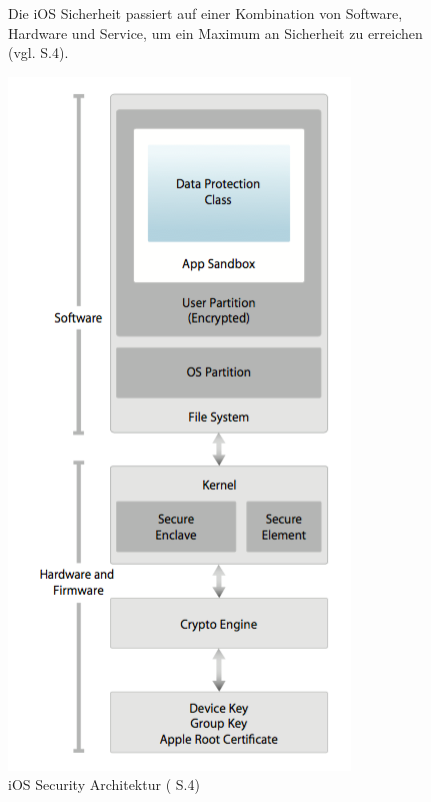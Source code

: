 \begin{figure}[htb]
\begin{minipage}{0.6\textwidth}
\begin{description}
\begin{enumerate}
			\end{enumerate}
   		\end{description}
Die iOS Sicherheit passiert auf einer Kombination von Software, Hardware und Service, um ein Maximum an Sicherheit zu erreichen (vgl. \cite{Apple[4]} S.4).
	\end{minipage}
	\hfil
	\begin{minipage}{0.4\textwidth}
		\includegraphics[width=\textwidth]{Bilder/Chapter3_SecArchitektur}
		\caption {iOS Security Architektur (\cite{Apple[4]} S.4)}
        \label{fig:iOS Security Architektur}
	\end{minipage}
\end{figure}
		    	

